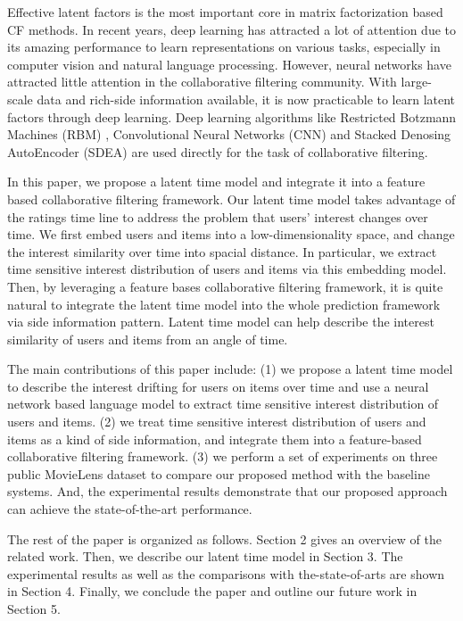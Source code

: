 \documentclass{sig-alternate-05-2015}
\begin{document}
Effective latent factors is the most important
core in matrix factorization based CF methods.
In recent years, deep learning \cite{hinton2006reducing, hinton2006fast}
has attracted a lot of attention due to its amazing performance
to learn representations on various tasks,
especially in computer vision and natural language processing.
However, neural networks have attracted little attention
in the collaborative filtering community.
With large-scale data and rich-side information available,
it is now practicable to learn latent factors
through deep learning.
Deep learning algorithms like Restricted Botzmann Machines (RBM)
\cite{salakhutdinov2007restricted},
Convolutional Neural Networks (CNN) \cite{wang2014improving} and
Stacked Denosing AutoEncoder (SDEA) \cite{wang2015collaborative}
are used directly for the task of collaborative filtering.

In this paper, we propose a latent time model and
integrate it into a feature based collaborative filtering framework.
Our latent time model takes advantage of the ratings time line
to address the problem that users' interest changes over time.
We first embed users and items into a low-dimensionality space,
and change the interest similarity over time into spacial distance.
In particular, we extract time sensitive interest distribution
of users and items via this embedding model.
Then, by leveraging a feature bases collaborative filtering framework,
it is quite natural to integrate the latent time model
into the whole prediction framework via side information pattern.
Latent time model can help describe the interest similarity of
users and items from an angle of time.

The main contributions of this paper include:
(1) we propose a latent time model to describe the interest
drifting for users on items over time and
use a neural network based language model to extract
time sensitive interest distribution of users and items.
(2) we treat time sensitive interest distribution of users and items
as a kind of side information, and integrate them into
a feature-based collaborative filtering framework.
(3) we perform a set of experiments on three public
MovieLens dataset to compare our proposed method
with the baseline systems.
And, the experimental results demonstrate that
our proposed approach can achieve the state-of-the-art performance.

The rest of the paper is organized as follows.
Section 2 gives an overview of the related work.
Then, we describe our latent time model in Section 3.
The experimental results as well as the comparisons with
the-state-of-arts are shown in Section 4.
Finally, we conclude the paper and
outline our future work in Section 5.
\end{document}
